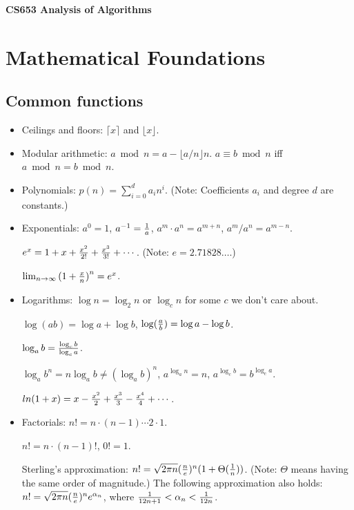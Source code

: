 \documentclass{article}
\begin{document}
\begin{Large}
\centerline {\bf CS653 Analysis of Algorithms}
\end{Large}

\section{Mathematical Foundations}

\subsection{Common functions}


\begin{itemize}

\item Ceilings and floors: $\lceil x \rceil$ and $\lfloor x \rfloor$.

\item Modular arithmetic: $a\bmod n=a-\lfloor a/n\rfloor n$.
$a\equiv b\bmod n$ iff $a\bmod n= b\bmod n$.

\item Polynomials: $p(n)=\sum_{i=0}^d a_in^i$. (Note: Coefficients
$a_i$ and degree $d$ are constants.)

\item Exponentials: $a^0=1$, $a^{-1}={1\over a}$, $a^m\cdot a^n=a^{m+n}$,
$a^m/a^n=a^{m-n}$.

$e^x=1+x+{x^2\over 2!}+{x^3\over 3!}+\cdots$. (Note: $e=2.71828\ldots$.)

$\lim_{n\to\infty}{(1+{x\over n})}^n=e^x$.

\item Logarithms: $\log n=\log_2 n$ or $\log_c n$ for some $c$ we don't care
about.

$\log(ab)=\log a+\log b$, $\log ({a\over b})=\log a-\log b$.

$\log_a b={{\log_c b}\over {\log_c a}}$.

$\log_a b^n=n\log_a b\not={(\log_a b)}^n$, $a^{\log_a n}=n$,
$a^{\log_c b}=b^{\log_c a}$.

$ln(1+x)=x-{x^2\over 2}+{x^3\over 3}-{x^4\over 4}+\cdots$.

\item Factorials: $n!=n\cdot (n-1)\cdots 2\cdot 1$.

$n!=n\cdot (n-1)!$, $0!=1$.

Sterling's approximation: $n!=\sqrt{2\pi n}({n\over e})^n(1+
\Theta({1\over n}))$. (Note: $\Theta$ means having the same order of 
magnitude.) The following approximation also holds:
$n!=\sqrt{2\pi n}({n\over e})^ne^{\alpha_n}$, where
${1\over 12n+1}<\alpha_n<{1\over 12n}$.


\end{itemize}
\end{document}

